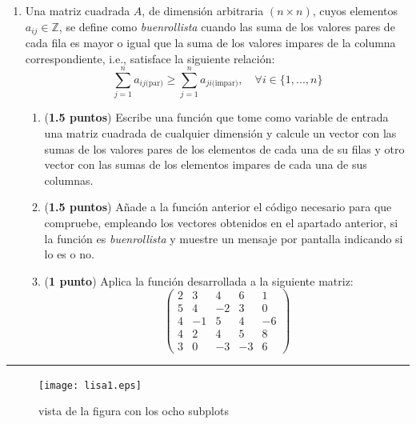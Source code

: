 \begin{enumerate}
\begin{enumerate}
\item \label{ap2} (\textbf{1.5 puntos}) Genera dos  vectores de frecuencias: \texttt{W1} y \texttt{W2} de  modo que el primero contenga los números impares comprendidos entre $1$ y $7$ y el segundo los números pares comprendidos entres $2$ y $8$.  Emplea la función creada en el apartado anterior para calcular el valor de las trayectorias obtenidas tomando como entradas para  $\omega_1, \omega_2$,  todos los pares posibles de la forma: \texttt{W1(i)} y \texttt{W2(j)}. Supón que no hay tercera entrada $a$. Realiza los cálculos empleando bucles.

\item (\textbf{1 punto}) Añade a tu programa el código necesario para que dibuje cada resultado en un \emph{subplot} de modo que la figura resultante tenga $4\times4$ \emph{subplots} (ver figura al dorso).  Debes crear los \emph{subplots} empleando los mismos bucles del apartados anterior. 

\item (\textbf{0.5 puntos}) Repite los cálculos de los apartados c) y d) pero tomando ahora $a=1$.
\end{enumerate}

\item Una matriz cuadrada $A$, de dimensión arbitraria $(n\times n)$, cuyos elementos $a_{ij} \in \mathbb{Z}$, se define como \emph{buenrollista} cuando las suma de los valores pares de cada fila es mayor o igual que la suma de los valores  impares de la columna correspondiente, i.e., satisface la siguiente relación:
\begin{equation}
	\sum_{j=1}^n a_{ij\text{(par)}} \geq \sum_{j=1}^n a_{ji\text{(impar)}}, \quad \forall i\in\{1,...,n\}
\end{equation}

\begin{enumerate}
\item (\textbf{1.5 puntos}) Escribe  una función que tome como variable de entrada una matriz cuadrada de cualquier dimensión 
y calcule un vector con las sumas de los valores pares de los elementos de cada una de su filas  y otro vector con las sumas de los elementos impares de cada una de sus columnas.
\item (\textbf{1.5 puntos}) Añade a la función anterior el código necesario para que compruebe, empleando los vectores obtenidos en el apartado anterior, si la función es \emph{buenrollista} y muestre un mensaje por pantalla indicando si lo es o no.
\item (\textbf{1 punto}) Aplica la función desarrollada a la siguiente matriz:
\begin{equation*}
\begin{pmatrix}
2&3&4&6&1\\
5&4&-2&3&0\\
4&-1&5&4&-6\\
4&2&4&5&8\\
3&0&-3&-3&6
\end{pmatrix}
\end{equation*}
\end{enumerate}
\end{enumerate}
\noindent\rule{\textwidth}{0.4pt}
\begin{figure}[h]
\centering
\texttt{[image: lisa1.eps]}
\caption{vista de la figura con los ocho subplots} \label{fig:1}
\end{figure}
